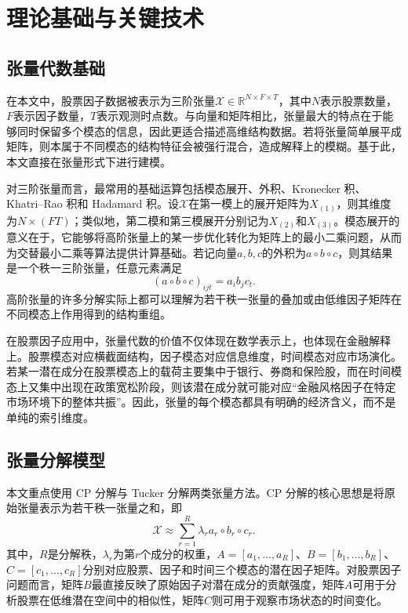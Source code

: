 \chapter{理论基础与关键技术}

\section{张量代数基础}

在本文中，股票因子数据被表示为三阶张量$\mathcal{X}\in\mathbb{R}^{N\times F\times T}$，其中$N$表示股票数量，$F$表示因子数量，$T$表示观测时点数。与向量和矩阵相比，张量最大的特点在于能够同时保留多个模态的信息，因此更适合描述高维结构数据。若将张量简单展平成矩阵，则本属于不同模态的结构特征会被强行混合，造成解释上的模糊。基于此，本文直接在张量形式下进行建模。

对三阶张量而言，最常用的基础运算包括模态展开、外积、Kronecker 积、Khatri--Rao 积和 Hadamard 积。设$\mathcal{X}$在第一模上的展开矩阵为$X_{(1)}$，则其维度为$N\times(FT)$；类似地，第二模和第三模展开分别记为$X_{(2)}$和$X_{(3)}$。模态展开的意义在于，它能够将高阶张量上的某一步优化转化为矩阵上的最小二乘问题，从而为交替最小二乘等算法提供计算基础。若记向量$a,b,c$的外积为$a\circ b\circ c$，则其结果是一个秩一三阶张量，任意元素满足
\begin{equation}
\left(a\circ b\circ c\right)_{ijt}=a_i b_j c_t.
\end{equation}
高阶张量的许多分解实际上都可以理解为若干秩一张量的叠加或由低维因子矩阵在不同模态上作用得到的结构重组。

在股票因子应用中，张量代数的价值不仅体现在数学表示上，也体现在金融解释上。股票模态对应横截面结构，因子模态对应信息维度，时间模态对应市场演化。若某一潜在成分在股票模态上的载荷主要集中于银行、券商和保险股，而在时间模态上又集中出现在政策宽松阶段，则该潜在成分就可能对应“金融风格因子在特定市场环境下的整体共振”。因此，张量的每个模态都具有明确的经济含义，而不是单纯的索引维度。

\section{张量分解模型}

本文重点使用 CP 分解与 Tucker 分解两类张量方法。CP 分解的核心思想是将原始张量表示为若干秩一张量之和，即
\begin{equation}
\mathcal{X}\approx \sum_{r=1}^{R}\lambda_r a_r\circ b_r\circ c_r.
\end{equation}
其中，$R$是分解秩，$\lambda_r$为第$r$个成分的权重，$A=[a_1,\ldots,a_R]$、$B=[b_1,\ldots,b_R]$、$C=[c_1,\ldots,c_R]$分别对应股票、因子和时间三个模态的潜在因子矩阵。对股票因子问题而言，矩阵$B$最直接反映了原始因子对潜在成分的贡献强度，矩阵$A$可用于分析股票在低维潜在空间中的相似性，矩阵$C$则可用于观察市场状态的时间变化。

